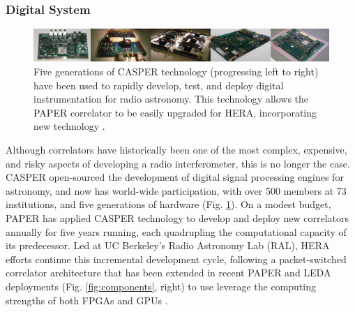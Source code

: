 \documentclass[preprint]{aastex}
\newcommand{\compress}{\vspace{-0.3in}}
\newcommand{\Caption}[4]{\vspace{#1}\renewcommand{\baselinestretch}{#2}\caption{#4}\vspace{#3}}
\begin{document}
%



\compress
\subsubsection{Digital System}
\label{sec:digital}

\begin{figure}[t]\centering
\includegraphics[width=6.5in]{plots/casper_boards.jpg}
\Caption{-0.3in}{0.9}{-0.15in}{\small
Five generations of CASPER technology (progressing left to right) have been used to rapidly
develop, test, and deploy digital instrumentation for radio astronomy.  This technology
allows the PAPER correlator to be 
easily upgraded for HERA, incorporating new technology
\citep{parsons_et_al2006,parsons_et_al2008}.
}\label{fig:casper_boards}
\end{figure}

Although correlators have historically been one of the most complex,
expensive, and risky aspects of developing a radio interferometer, this is no longer the case.
CASPER \citep{parsons_et_al2006}
open-sourced the development of digital signal processing engines for astronomy, and
now has world-wide participation,
with over 500 members at 73 institutions, and 
five generations of hardware (Fig. \ref{fig:casper_boards}). 
On a modest budget, PAPER has applied CASPER technology to develop and deploy new correlators
annually for five years running, each quadrupling the computational capacity of its predecessor.
Led at UC Berkeley's Radio Astronomy Lab (RAL),
HERA efforts continue this incremental development cycle, following a packet-switched
correlator architecture \citep{parsons_et_al2008} that has been
extended in recent PAPER and LEDA deployments (Fig. \ref{fig:components}, right)
to use leverage the computing strengths of both FPGAs and GPUs \citep{clark_et_al2011}.
\end{document}
